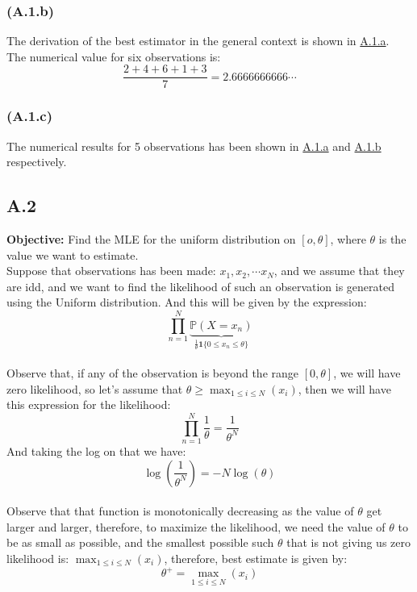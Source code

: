 \documentclass[]{article}
\begin{document}
        \subsubsection*{(A.1.b)}\label{A.1.b}
            The derivation of the best estimator in the general context is shown in \hyperref[A.1.a]{A.1.a}. 
            \\[1em]
            The numerical value for six observations is: 
            $$
                \frac{2 + 4 + 6 + 1 + 3}{7} = 2.6666666666\cdots
            $$
        \subsubsection*{(A.1.c)}
            The numerical results for 5 observations has been shown in \hyperref[A.1.a]{A.1.a} and \hyperref[A.1.b]{A.1.b} respectively. 
            
    \subsection*{A.2}
        \textbf{Objective: } Find the MLE for the uniform distribution on $[o, \theta]$, where $\theta$ is the value we want to estimate.
        \\[1em]
        Suppose that observations has been made: $x_1, x_2, \cdots x_N$, and we assume that they are idd, and we want to find the likelihood of such an observation is generated using the Uniform distribution. And this will be given by the expression: 
        \begin{equation*}\tag{A.2.1}\label{eqn:A.2.1}
            \prod_{n = 1}^{N} 
            \underbrace{
            \mathbb{P}\left(X = x_n\right)}_{\frac{1}{\theta}\mathbf{1}\{0 \le x_n \le \theta\}}
        \end{equation*}
        \\[1em]
        Observe that, if any of the observation is beyond the range $[0, \theta]$, we will have zero likelihood, so let's assume that $\theta \ge \max_{1\le i \le N}(x_i)$, then we will have this expression for the likelihood: 
        \begin{equation*}\tag{A.2.2}\label{eqn:A.2.2}
            \prod_{n = 1}^{N} 
            \frac{1}{\theta} = \frac{1}{\theta^N}
        \end{equation*}
        And taking the log on that we have: 
        \begin{equation*}\tag{A.2.3}\label{eqn:A.2.3}
            \log\left(\frac{1}{\theta^N}\right) = -N\log(\theta)
        \end{equation*}
        \\[1em]
        Observe that that function is monotonically decreasing as the value of $\theta$ get larger and larger, therefore, to maximize the likelihood, we need the value of $\theta$ to be as small as possible, and the smallest possible such $\theta$ that is not giving us zero likelihood is: $\max_{1\le i \le N}(x_i)$, therefore, best estimate is given by: 
        $$
            \theta^+ =\max_{1\le i \le N}(x_i)
        $$
\end{document}
